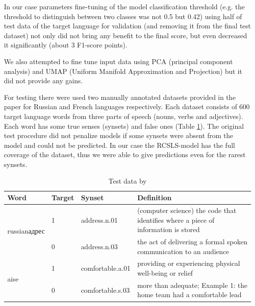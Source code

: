\documentclass[conference]{IEEEtran}
\begin{document}
	In our case parameters fine-tuning of the model classification threshold (e.g. the threshold to distinguish between two classes was not 0.5 but 0.42) using half of test data of the target language for validation (and removing it from the final test dataset) not only did not bring any benefit to the final score, but even decreased it significantly (about 3 F1-score points).
	
	We also attempted to fine tune input data using PCA (principal component analysis) and UMAP (Uniform Manifold Approximation and Projection) \cite{umap} but it did not provide any gains.
	
	For testing there were used two manually annotated datasets provided in the paper \cite{Khodak2017} for Russian and French languages respectively. Each dataset consists of 600 target language words from three parts of speech (nouns, verbs and adjectives). Each word has some true senses (synsets) and false ones (Table \ref{wordnet-test-data}). The original test procedure did not penalize models if some synsets were absent from the model and could not be predicted. In our case the RCSLS-model has the full coverage of the dataset, thus we were able to give predictions even for the rarest synsets.
	
	\begin{table}[!htbp]
		\small
		\caption{Test data by \cite{Khodak2017}}
		\label{wordnet-test-data}		
		\centering
		\begin{tabular}{l l l l}
			\hline
			Word & Target &  Synset & Definition \\ \hline
			\multirow{2}{*}{\begin{otherlanguage*}{russian}адрес \end{otherlanguage*}}
			& \multicolumn{1}{l}{1} & \multicolumn{1}{l}{address.n.01} & \multicolumn{1}{l}{(computer science) the code that identifies where a piece of information is stored} \\
			& \multicolumn{1}{l}{0} & \multicolumn{1}{l}{address.n.03} & \multicolumn{1}{l}{the act of delivering a formal spoken communication to an audience} \\
			\hline
			\multirow{2}{*}{aise}
			& \multicolumn{1}{l}{1} & \multicolumn{1}{l}{comfortable.a.01} & \multicolumn{1}{l}{providing or experiencing physical well-being or relief} \\
			& \multicolumn{1}{l}{0} & \multicolumn{1}{l}{comfortable.s.03} & \multicolumn{1}{l}{more than adequate; Example 1: the home team had a comfortable lead} \\
			\hline
		\end{tabular}
		
	\end{table}
	
\end{document}
